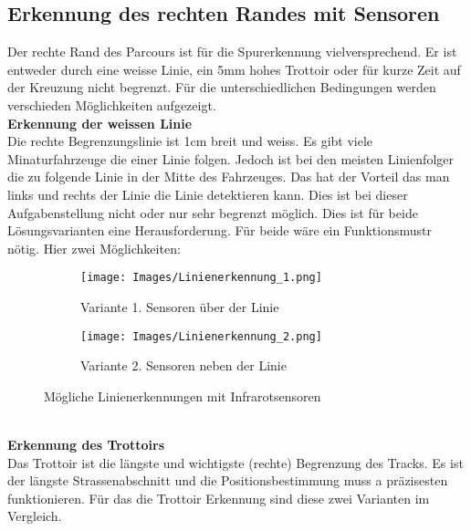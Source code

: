 
\subsection{Erkennung des rechten Randes mit Sensoren}
Der rechte Rand des Parcours ist für die Spurerkennung vielversprechend. Er ist entweder durch eine weisse Linie, ein 5mm hohes Trottoir oder für kurze Zeit auf der Kreuzung nicht begrenzt.
Für die unterschiedlichen Bedingungen werden verschieden Möglichkeiten aufgezeigt.\\

\textbf {Erkennung der weissen Linie} \\
Die rechte Begrenzungslinie ist 1cm breit und weiss. Es gibt viele Minaturfahrzeuge die einer Linie folgen. Jedoch ist bei den meisten Linienfolger die zu folgende Linie in der Mitte des Fahrzeuges. Das hat der Vorteil das man links und rechts der Linie die Linie detektieren kann. Dies ist bei dieser Aufgabenstellung nicht oder nur sehr begrenzt möglich. Dies ist für beide Lösungsvarianten eine Herausforderung. Für beide wäre ein Funktionsmustr nötig.
Hier zwei Möglichkeiten:

\begin{figure} [hbp]
	\centering
	\begin{subfigure}[b]{0.4\textwidth}
		\texttt{[image: Images/Linienerkennung\_1.png]}
		\caption{Variante 1. Sensoren über der Linie}
	\end{subfigure}
	\hfill
	\begin{subfigure}[b]{0.42\textwidth}
		\texttt{[image: Images/Linienerkennung\_2.png]}
		\caption{Variante 2. Sensoren neben der Linie}
\end{subfigure}
	\caption{Mögliche Linienerkennungen mit Infrarotsensoren}\label{fig:animals}
\end{figure}\\


\textbf {Erkennung des Trottoirs} \\
Das Trottoir ist die längste und wichtigste (rechte) Begrenzung des Tracks. Es ist der längste Strassenabschnitt und die Positionsbestimmung muss a präzisesten funktionieren. Für das die Trottoir Erkennung sind diese zwei Varianten im Vergleich.
 

